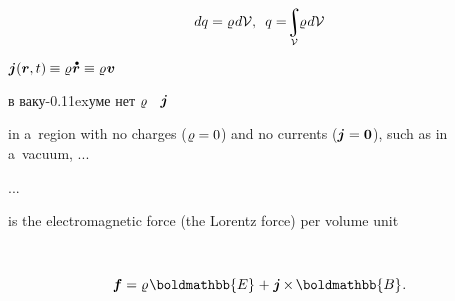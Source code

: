 \nopagebreak\vspace{-0.2em}\begin{equation*}
dq = \chargedensity \hspace{.15ex} d \mathcal{V}
, \hspace{.5em}
q = \hspace{-0.5ex} \scalebox{0.9}{$\displaystyle\integral\displaylimits_{\mathcal{V}}$} \hspace{-0.3ex} \chargedensity \hspace{.15ex} d\mathcal{V}
\end{equation*}

  
${\currentdensity(\locationvector, t) \hspace{-0.1ex} \equiv \chargedensity \hspace{.1ex} \mathdotabove{\locationvector} \equiv \chargedensity \hspace{.1ex} \bm{v}}$

\foreignlanguage{russian}{в ваку\kern-0.11exуме нет $\varrho$ ~$\bm{j}$}

in a~region with no charges (${\varrho = 0}$) and no currents (${\bm{j} = \bm{0}}$), such as in a~vacuum, ...

...

 is the electromagnetic force (the Lorentz force) per volume unit

~
\ru{)} 

\nopagebreak\vspace{-0.2em}\en{\vspace{-0.7em}}\begin{equation}\label{ponderomotive.electromagneticforcepervolumeunit}
\bm{f} = \chargedensity \hspace{.16ex} \boldmathbb{E} \hspace{.1ex} + \hspace{.1ex} \currentdensity \hspace{-0.16ex} \times \hspace{-0.2ex} \boldmathbb{B}
\hspace{.1ex} .
\end{equation}

